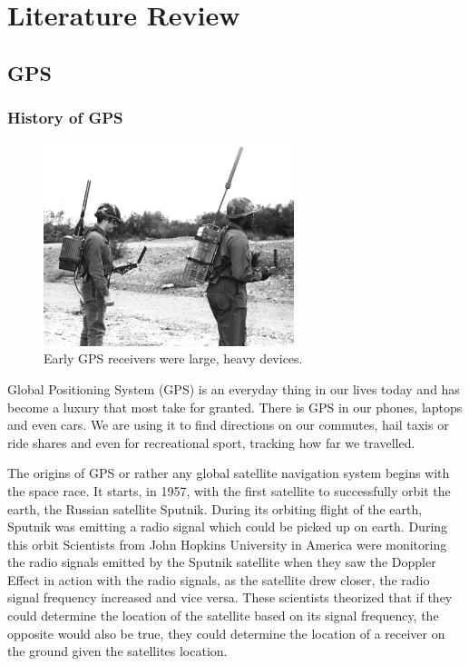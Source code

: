 \chapter{Literature Review}
\section{GPS}
\subsection{History of GPS}
\begin{figure}
	\begin{center}
		\includegraphics[width = 0.65\textwidth]{figures/historyGPS.jpg}
		\caption{Early GPS receivers were large, heavy devices. \cite{USAF1978}}
		\label{fig:2:histGPS}
	\end{center}
\end{figure}
Global Positioning System (GPS) is an everyday thing in our lives today and has become a luxury that most take for granted. There is GPS in our phones, laptops and even cars. We are using it to find directions on our commutes, hail taxis or ride shares and even for recreational sport, tracking how far we travelled.\par
\vspace{0.6cm}
The origins of GPS or rather any global satellite navigation system begins with the space race. It starts, in 1957, with the first satellite to successfully orbit the earth, the Russian satellite Sputnik. During its orbiting flight of the earth, Sputnik was emitting a radio signal which could be picked up on earth. During this orbit Scientists from John Hopkins University in America were monitoring the radio signals emitted by the Sputnik satellite when they saw the Doppler Effect in action with the radio signals, as the satellite drew closer, the radio signal frequency increased and vice versa. These scientists theorized that if they could determine the location of the satellite based on its signal frequency, the opposite would also be true, they could determine the location of a receiver on the ground given the satellites location. \cite{Aerospace2021}\par
